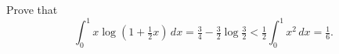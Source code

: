 Prove that
\[
\int_{0}^{1} x \log(1 + \tfrac{1}{2}x)\, dx
  = \tfrac{3}{4} - \tfrac{3}{2}\log\tfrac{3}{2}
  < \tfrac{1}{2} \int_{0}^{1} x^{2}\, dx
  = \tfrac{1}{6}.
\]

